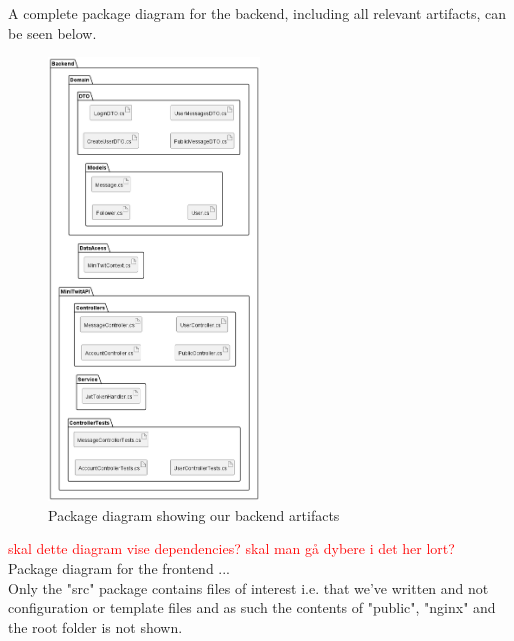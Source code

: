 A complete package diagram for the backend, including all relevant artifacts, can be seen below.
\begin{figure}[H]
 \centering
 \includegraphics[width = 0.5\textwidth]{Images/backend_complete_package.png}
 \caption{Package diagram showing our backend artifacts}
 \label{fig:BackendCompletePackageDiagram}
\end{figure}
\textcolor{red}{skal dette diagram vise dependencies?}
\textcolor{red}{skal man gå dybere i det her lort?} \\

Package diagram for the frontend ... \\
Only the "src" package contains files of interest i.e. that we've written and not configuration or template files and as such the contents of "public", "nginx" and the root folder is not shown.

